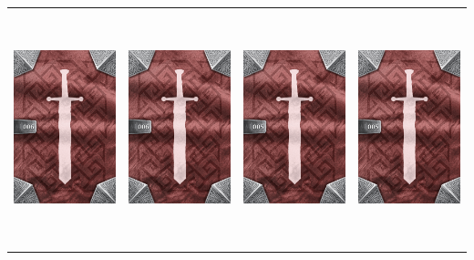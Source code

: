 \documentclass{minimal}
\begin{document}
{\begin{longtable}{llll}
\includegraphics[width=44mm,height=68mm]{./1-14/gh-006-eagle-eye-goggles-back.png} &
\includegraphics[width=44mm,height=68mm]{./1-14/gh-006-eagle-eye-goggles-back.png} &
\includegraphics[width=44mm,height=68mm]{./1-14/gh-005-cloak-of-invisibility-back.png} &
\includegraphics[width=44mm,height=68mm]{./1-14/gh-005-cloak-of-invisibility-back.png}\\ 

\end{longtable}}
\end{document}
